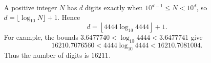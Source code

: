 A positive integer $N$ has $d$ digits exactly when $10^{d-1}\le N<10^d$, so $d=\lfloor\log_{10}N\rfloor+1$. Hence
\[
d=\left\lfloor4444\log_{10}4444\right\rfloor+1.
\]
For example, the bounds $3.6477740<\log_{10}4444<3.6477741$ give
\[
16210.7076560<4444\log_{10}4444<16210.7081004.
\]
Thus the number of digits is $\boxed{16211}$.
